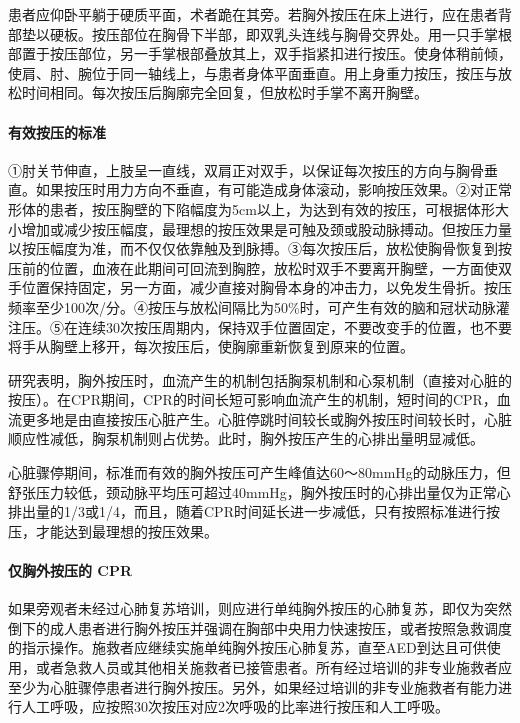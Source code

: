 患者应仰卧平躺于硬质平面，术者跪在其旁。若胸外按压在床上进行，应在患者背部垫以硬板。按压部位在胸骨下半部，即双乳头连线与胸骨交界处。用一只手掌根部置于按压部位，另一手掌根部叠放其上，双手指紧扣进行按压。使身体稍前倾，使肩、肘、腕位于同一轴线上，与患者身体平面垂直。用上身重力按压，按压与放松时间相同。每次按压后胸廓完全回复，但放松时手掌不离开胸壁。

\paragraph{有效按压的标准}

①肘关节伸直，上肢呈一直线，双肩正对双手，以保证每次按压的方向与胸骨垂直。如果按压时用力方向不垂直，有可能造成身体滚动，影响按压效果。②对正常形体的患者，按压胸壁的下陷幅度为5cm以上，为达到有效的按压，可根据体形大小增加或减少按压幅度，最理想的按压效果是可触及颈或股动脉搏动。但按压力量以按压幅度为准，而不仅仅依靠触及到脉搏。③每次按压后，放松使胸骨恢复到按压前的位置，血液在此期间可回流到胸腔，放松时双手不要离开胸壁，一方面使双手位置保持固定，另一方面，减少直接对胸骨本身的冲击力，以免发生骨折。按压频率至少100次/分。④按压与放松间隔比为50\%时，可产生有效的脑和冠状动脉灌注压。⑤在连续30次按压周期内，保持双手位置固定，不要改变手的位置，也不要将手从胸壁上移开，每次按压后，使胸廓重新恢复到原来的位置。

研究表明，胸外按压时，血流产生的机制包括胸泵机制和心泵机制（直接对心脏的按压）。在CPR期间，CPR的时间长短可影响血流产生的机制，短时间的CPR，血流更多地是由直接按压心脏产生。心脏停跳时间较长或胸外按压时间较长时，心脏顺应性减低，胸泵机制则占优势。此时，胸外按压产生的心排出量明显减低。

心脏骤停期间，标准而有效的胸外按压可产生峰值达60～80mmHg的动脉压力，但舒张压力较低，颈动脉平均压可超过40mmHg，胸外按压时的心排出量仅为正常心排出量的1/3或1/4，而且，随着CPR时间延长进一步减低，只有按照标准进行按压，才能达到最理想的按压效果。

\paragraph{仅胸外按压的 CPR}

如果旁观者未经过心肺复苏培训，则应进行单纯胸外按压的心肺复苏，即仅为突然倒下的成人患者进行胸外按压并强调在胸部中央用力快速按压，或者按照急救调度的指示操作。施救者应继续实施单纯胸外按压心肺复苏，直至AED到达且可供使用，或者急救人员或其他相关施救者已接管患者。所有经过培训的非专业施救者应至少为心脏骤停患者进行胸外按压。另外，如果经过培训的非专业施救者有能力进行人工呼吸，应按照30次按压对应2次呼吸的比率进行按压和人工呼吸。

